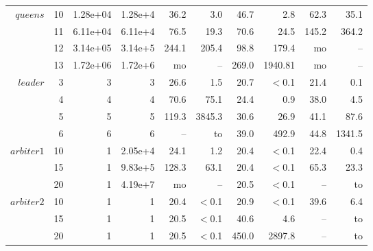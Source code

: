 \begin{tabular}{|r|r|r|r|r| r|r|r|r|r|}
\hline
\multirow{3}{*}{$queens$} & 10    &1.28e+04   &1.28e+4        &36.2       &3.0        &46.7       &2.8        &62.3       &35.1 \\
                                                & 11    &6.11e+04   &6.11e+4        &76.5       &19.3       &70.6       &24.5       &145.2      &364.2 \\
                                                & 12    &3.14e+05   &3.14e+5        &244.1      &205.4      &98.8       &179.4      &mo         &-- \\
                                                & 13    &1.72e+06   &1.72e+6        &mo         &--         &269.0      &1940.81    &mo         &-- \\
\hline
\multirow{4}{*}{$leader$} &3  &3  &3  &26.6       &1.5            &20.7   &$<$0.1       &21.4   &0.1 \\
                                                &4  &4  &4  &70.6       &75.1           &24.4   &0.9            &38.0   &4.5 \\
                                                &5  &5  &5  &119.3      &3845.3         &30.6   &26.9           &41.1   &87.6 \\
                                                &6  &6  &6  &--         &to             &39.0   &492.9          &44.8   &1341.5 \\
\hline
\multirow{3}{*}{$arbiter1$}&10    &1  &2.05e+4        &24.1   &1.2        &20.4             &$<$0.1     &22.4   &0.4  \\
                                                &15 &1  &9.83e+5        &128.3  &63.1       &20.4       &$<$0.1     &65.3   &23.3 \\
                                                &20 &1  &4.19e+7        &mo     &--         &20.5       &$<$0.1     &--     &to     \\
\hline
\multirow{3}{*}{$arbiter2$}   &10 & 1 & 1     &20.4   & $<$0.1        &20.9       & $<$0.1         &39.6       & 6.4  \\
                              &15 & 1 & 1     &20.5   & $<$0.1        &40.6       & 4.6            &--     & to     \\
                              &20 & 1 & 1     &20.5   & $<$0.1        &450.0      & 2897.8         &--     & to    \\
\hline
\end{tabular}

